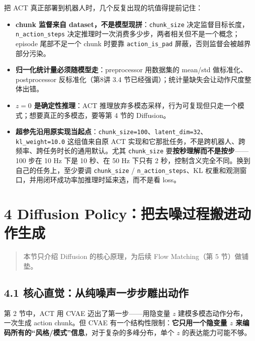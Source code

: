 \documentclass[
  chinese,
]{ctexart}
\providecommand{\tightlist}{%
  \setlength{\itemsep}{0pt}\setlength{\parskip}{0pt}}
\begin{document}
把 ACT 真正部署到机器人时，几个反复出现的坑值得提前记住：

\begin{itemize}
\tightlist
\item
  \textbf{chunk 监督来自 dataset，不是模型现拼}：\texttt{chunk\_size}
  决定监督目标长度，\texttt{n\_action\_steps}
  决定推理时一次消费多少步，两者相关但不是一个概念；episode 尾部不足一个
  chunk 时要靠 \texttt{action\_is\_pad} 屏蔽，否则监督会被越界部分污染。
\item
  \textbf{归一化统计量必须随模型走}：preprocessor 用数据集的 mean/std
  做标准化、postprocessor 反标准化（第8讲 3.4
  节已经强调）；统计量缺失会让动作尺度整体出错。
\item
  \textbf{\(z=0\) 是确定性推理}：ACT
  推理放弃多模态采样，行为可复现但只走一个模式；想要真正的多模态，要等第
  4 节的 Diffusion。
\item
  \textbf{超参先沿用原实现当起点}：\texttt{chunk\_size=100}、\texttt{latent\_dim=32}、\texttt{kl\_weight=10.0}
  这组值来自原 ACT
  实现和它那批任务，不是跨机器人、跨频率、跨任务时长的通用默认。尤其
  \texttt{chunk\_size} 要\textbf{按秒理解而不是按步}------100 步在 10 Hz
  下是 10 秒、在 50 Hz 下只有 2
  秒，控制含义完全不同。换到自己的任务上，至少要调 \texttt{chunk\_size}
  / \texttt{n\_action\_steps}、KL
  权重和观测窗口，并用闭环成功率加推理时延来选，而不是看 loss。
\end{itemize}

\section{4 Diffusion
Policy：把去噪过程搬进动作生成}\label{diffusion-policyux628aux53bbux566aux8fc7ux7a0bux642cux8fdbux52a8ux4f5cux751fux6210}

\begin{quote}
本节只介绍 Diffusion 的核心原理，为后续 Flow Matching（第 5 节）做铺垫。
\end{quote}

\subsection{4.1
核心直觉：从纯噪声一步步雕出动作}\label{ux6838ux5fc3ux76f4ux89c9ux4eceux7eafux566aux58f0ux4e00ux6b65ux6b65ux96d5ux51faux52a8ux4f5c}

第 2 节中，ACT 用 CVAE 迈出了第一步------用隐变量 \(z\)
建模多模态动作分布，一次生成 action chunk。但 CVAE
有一个结构性限制：\textbf{它只用一个隐变量 \(z\)
来编码所有的``风格/模式''信息}，对于复杂的多峰分布，单个 \(z\)
的表达能力可能不够。
\end{document}
